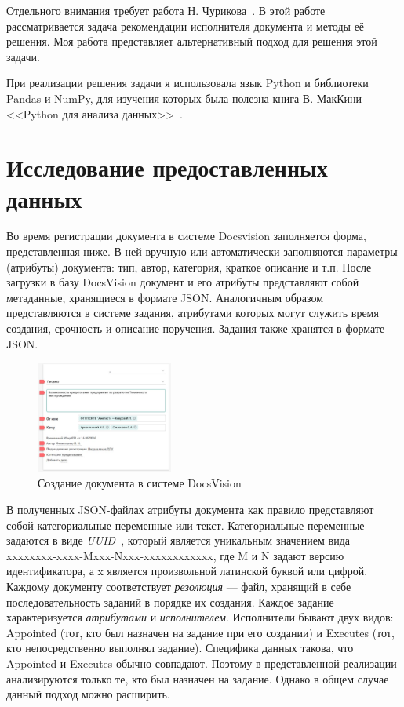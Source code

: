 \documentclass[14pt]{matmex-diploma-custom}
\begin{document}
Отдельного внимания требует работа Н. Чурикова~\cite{Churikov}. В этой работе рассматривается задача рекомендации исполнителя документа и методы её решения. Моя работа представляет альтернативный подход для решения этой задачи.

При реализации решения задачи я использовала язык Python и библиотеки Pandas и NumPy, для изучения которых была полезна книга В. МакКини <<Python для анализа данных>>~\cite{mckinney}.

\section{Исследование предоставленных данных}
Во время регистрации документа в системе Docsvision заполняется форма, представленная ниже. В ней вручную или автоматически заполняются параметры (атрибуты) документа: тип, автор, категория, краткое описание и т.п. После загрузки в базу DocsVision документ и его атрибуты представляют собой метаданные, хранящиеся в формате JSON. Аналогичным образом представляются в системе задания, атрибутами которых могут служить время создания, срочность и описание поручения. Задания также хранятся в формате JSON.

\begin{figure}[h]
\caption{Создание документа в системе DocsVision}
\centering
\includegraphics[width=0.4\textwidth]{images/letter.png}
\end{figure}

В полученных JSON-файлах атрибуты документа как правило представляют собой категориальные переменные или текст. Категориальные переменные задаются в виде \textit{UUID}~\cite{uuidwiki}, который является уникальным значением вида xxxxxxxx-xxxx-Mxxx-Nxxx-xxxxxxxxxxxx, где M и N задают версию идентификатора, а x является произвольной латинской буквой или цифрой. Каждому документу соответствует \textit{резолюция} --- файл, хранящий в себе последовательность заданий в порядке их создания. Каждое задание характеризуется \textit{атрибутами} и \textit{исполнителем}. Исполнители бывают двух видов: Appointed (тот, кто был назначен на задание при его создании) и Executes (тот, кто непосредственно выполнял задание). Специфика данных такова, что Appointed и Executes обычно совпадают. Поэтому в представленной реализации анализируются только те, кто был назначен на задание. Однако в общем случае данный подход можно расширить.
\end{document}
